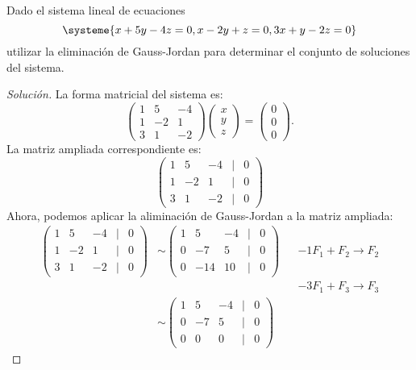 \documentclass[a4,11pt]{aleph-notas}
\begin{document}
\begin{ejer}
    Dado el sistema lineal de ecuaciones 
    \[
    \systeme{x+5y-4z=0, x-2y+z=0, 3x+y-2z=0}
    \]
    utilizar la eliminación de Gauss-Jordan para determinar el conjunto de soluciones del sistema.
\end{ejer}

\begin{proof}[Solución]\hspace{0pt}
    La forma matricial del sistema es:
    \[
    \begin{pmatrix}
    1&5&-4\\1&-2&1\\3&1&-2
    \end{pmatrix}
    \begin{pmatrix}
    x \\ y\\ z
    \end{pmatrix}
    =
    \begin{pmatrix}
    0 \\ 0\\ 0
    \end{pmatrix}.
    \]
    La matriz ampliada correspondiente es:
    \[
    \begin{pmatrix}
    1&5&-4&|&0\\
    1&-2&1&|&0\\
    3&1&-2&|&0
    \end{pmatrix}
    \]
    Ahora, podemos aplicar la aliminación de Gauss-Jordan a la matriz ampliada:
    \begin{align*}
      \begin{pmatrix}
        1&5&-4&|&0\\
        1&-2&1&|&0\\
        3&1&-2&|&0
      \end{pmatrix}
      & \sim 
      \begin{pmatrix}
        1&5&-4&|&0\\
        0&-7&5&|&0\\
        0&-14&10&|&0
      \end{pmatrix}
      && -1F_1+F_2\to F_2\\
      &&&-3F_1+F_3\to F_3\\
      & \sim 
      \begin{pmatrix}
        1&5&-4&|&0\\
        0&-7&5&|&0\\
        0&0&0&|&0
      \end{pmatrix}

\end{align*}
\end{proof}
\end{document}
